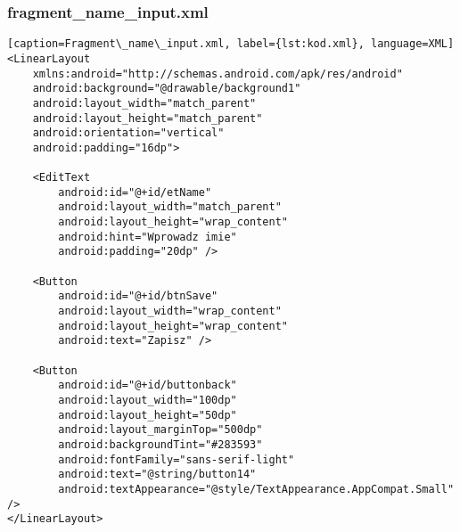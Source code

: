 \subsubsection{fragment\_name\_input.xml}
\begin{lstlisting}
[caption=Fragment\_name\_input.xml, label={lst:kod.xml}, language=XML]
<LinearLayout
    xmlns:android="http://schemas.android.com/apk/res/android"
    android:background="@drawable/background1"
    android:layout_width="match_parent"
    android:layout_height="match_parent"
    android:orientation="vertical"
    android:padding="16dp">

    <EditText
        android:id="@+id/etName"
        android:layout_width="match_parent"
        android:layout_height="wrap_content"
        android:hint="Wprowadz imie"
        android:padding="20dp" />

    <Button
        android:id="@+id/btnSave"
        android:layout_width="wrap_content"
        android:layout_height="wrap_content"
        android:text="Zapisz" />

    <Button
        android:id="@+id/buttonback"
        android:layout_width="100dp"
        android:layout_height="50dp"
        android:layout_marginTop="500dp"
        android:backgroundTint="#283593"
        android:fontFamily="sans-serif-light"
        android:text="@string/button14"
        android:textAppearance="@style/TextAppearance.AppCompat.Small" />
</LinearLayout>
\end{lstlisting}
